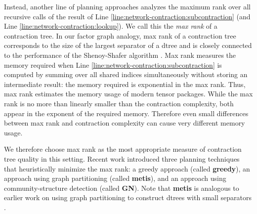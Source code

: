 Instead, another line of planning approaches analyzes the maximum rank over all recursive calls of the result of Line \ref{line:network-contraction:subcontraction} (and Line \ref{line:network-contraction:lookup}). We call this the \emph{max rank} of a contraction tree. In our factor graph analogy, max rank of a contraction tree corresponds to the size of the largest separator of a dtree \cite{darwiche01b} and is closely connected to the performance of the Shenoy-Shafer algorithm \cite{shenoy97,SS08}. Max rank measures the memory required when Line \ref{line:network-contraction:subcontraction} is computed by summing over all shared indices simultaneously without storing an intermediate result: the memory required is exponential in the max rank. Thus, max rank estimates the memory usage of modern tensor packages. While the max rank is no more than linearly smaller than the contraction complexity, both appear in the exponent of the required memory. Therefore even small differences between max rank and contraction complexity can cause very different memory usage. 

We therefore choose max rank as the most appropriate measure of contraction tree quality in this setting. 
Recent work \cite{KCMR18} introduced three planning techniques that heuristically minimize the max rank: a greedy approach (called \textbf{greedy}), an approach using graph partitioning (called \textbf{metis}), and an approach using community-structure detection (called \textbf{GN}). Note that \textbf{metis} is analogous to earlier work on using graph partitioning to construct dtrees with small separators \cite{darwiche01b}.